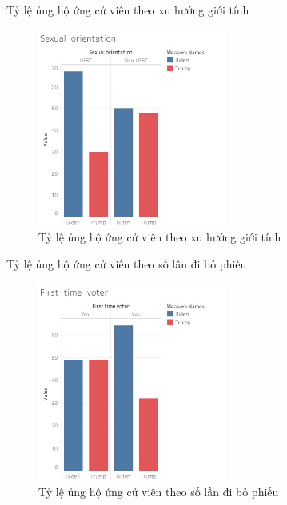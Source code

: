 \documentclass[10pt]{beamer}
\theoremstyle{remark}
\theoremstyle{definition}
\begin{document}
\begin{frame}{Tỷ lệ ủng hộ ứng cử viên theo xu hướng giới tính}
	\begin{figure}[h!]
        \centering
        \includegraphics[width=0.55\textwidth]{figures/Sexual_orientation.png}
        \caption{Tỷ lệ ủng hộ ứng cử viên theo xu hướng giới tính}
    \end{figure}
\end{frame}


\begin{frame}{Tỷ lệ ủng hộ ứng cử viên theo số lần đi bỏ phiếu}
	\begin{figure}[h!]
        \centering
        \includegraphics[width=0.55\textwidth]{figures/First_time_voter.png}
        \caption{Tỷ lệ ủng hộ ứng cử viên theo số lần đi bỏ phiếu}
    \end{figure}
\end{frame}
\end{document}
